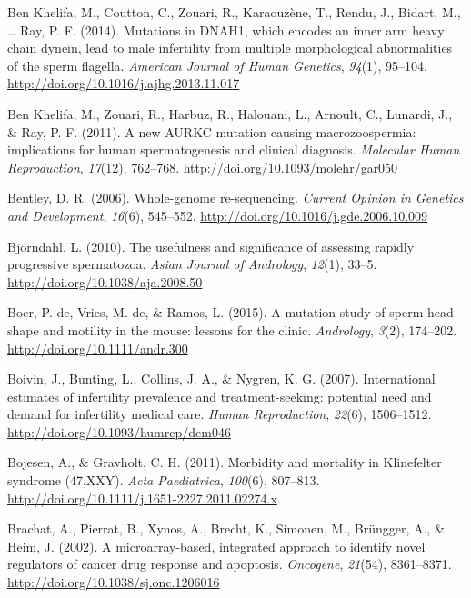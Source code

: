 \documentclass[12pt,twoside]{reedthesis}
\theoremstyle{definition}
\theoremstyle{definition}
\theoremstyle{remark}
\begin{document}
  \hypertarget{ref-BenKhelifa2014}{}
  Ben Khelifa, M., Coutton, C., Zouari, R., Karaouzène, T., Rendu, J.,
  Bidart, M., \ldots{} Ray, P. F. (2014). Mutations in DNAH1, which
  encodes an inner arm heavy chain dynein, lead to male infertility from
  multiple morphological abnormalities of the sperm flagella.
  \emph{American Journal of Human Genetics}, \emph{94}(1), 95--104.
  \url{http://doi.org/10.1016/j.ajhg.2013.11.017}
  
  \hypertarget{ref-BenKhelifa2011}{}
  Ben Khelifa, M., Zouari, R., Harbuz, R., Halouani, L., Arnoult, C.,
  Lunardi, J., \& Ray, P. F. (2011). A new AURKC mutation causing
  macrozoospermia: implications for human spermatogenesis and clinical
  diagnosis. \emph{Molecular Human Reproduction}, \emph{17}(12), 762--768.
  \url{http://doi.org/10.1093/molehr/gar050}
  
  \hypertarget{ref-Bentley2006}{}
  Bentley, D. R. (2006). Whole-genome re-sequencing. \emph{Current Opinion
  in Genetics and Development}, \emph{16}(6), 545--552.
  \url{http://doi.org/10.1016/j.gde.2006.10.009}
  
  \hypertarget{ref-Bjorndahl2010}{}
  Björndahl, L. (2010). The usefulness and significance of assessing
  rapidly progressive spermatozoa. \emph{Asian Journal of Andrology},
  \emph{12}(1), 33--5. \url{http://doi.org/10.1038/aja.2008.50}
  
  \hypertarget{ref-DeBoer2015}{}
  Boer, P. de, Vries, M. de, \& Ramos, L. (2015). A mutation study of
  sperm head shape and motility in the mouse: lessons for the clinic.
  \emph{Andrology}, \emph{3}(2), 174--202.
  \url{http://doi.org/10.1111/andr.300}
  
  \hypertarget{ref-Boivin2007a}{}
  Boivin, J., Bunting, L., Collins, J. A., \& Nygren, K. G. (2007).
  International estimates of infertility prevalence and treatment-seeking:
  potential need and demand for infertility medical care. \emph{Human
  Reproduction}, \emph{22}(6), 1506--1512.
  \url{http://doi.org/10.1093/humrep/dem046}
  
  \hypertarget{ref-Bojesen2011}{}
  Bojesen, A., \& Gravholt, C. H. (2011). Morbidity and mortality in
  Klinefelter syndrome (47,XXY). \emph{Acta Paediatrica}, \emph{100}(6),
  807--813. \url{http://doi.org/10.1111/j.1651-2227.2011.02274.x}
  
  \hypertarget{ref-Brachat2002}{}
  Brachat, A., Pierrat, B., Xynos, A., Brecht, K., Simonen, M., Brüngger,
  A., \& Heim, J. (2002). A microarray-based, integrated approach to
  identify novel regulators of cancer drug response and apoptosis.
  \emph{Oncogene}, \emph{21}(54), 8361--8371.
  \url{http://doi.org/10.1038/sj.onc.1206016}
  
\end{document}
